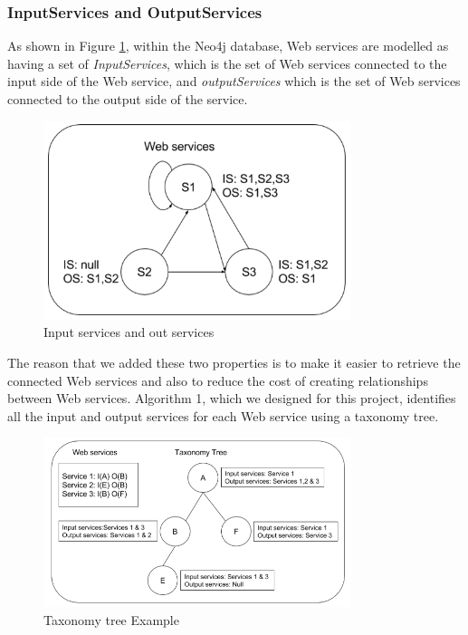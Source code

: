 \subsubsection {InputServices and OutputServices}
As shown in Figure \ref{fig:inputOutputServs}, within the Neo4j database, Web services are modelled as having a set of \emph{InputServices}, which is the set of Web services connected to the input side of the Web service, and  \emph{outputServices} which is the set of Web services connected to the output side of the service.\par
\begin{figure}[H]
\includegraphics[width=9cm]{InputServicesAndOutServices.png}
\centering
\caption{Input services and out services}
\label{fig:inputOutputServs} 
\end{figure} 
The reason that we added these two properties is to make it easier to retrieve the connected Web services and also to reduce the cost of creating relationships between Web services. Algorithm 1, which we designed for this project, identifies all the input and output services for each Web service using a taxonomy tree. \par
\begin{figure}[H]
\includegraphics[width=9cm]{Figure3-2-taxonomy-tree-example.png}
\centering
\caption{Taxonomy tree Example}
\label{fig:taxonomyTree} 
\end{figure} 
